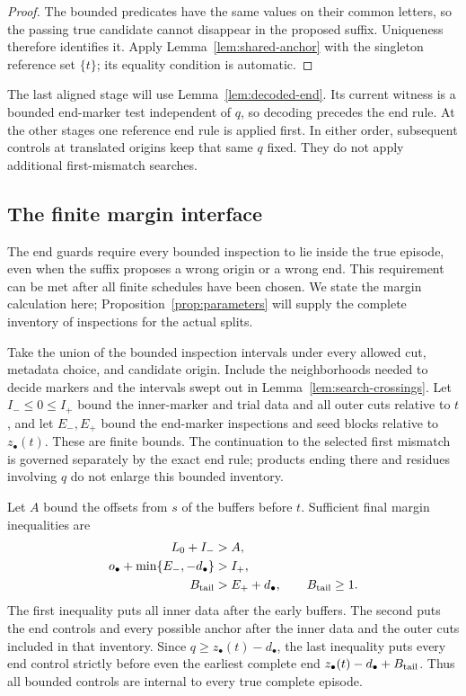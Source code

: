 \begin{proof}
The bounded predicates have the same values on their common letters,
so the passing true candidate cannot disappear in the proposed suffix.
Uniqueness therefore identifies it.  Apply
Lemma~\ref{lem:shared-anchor} with the singleton reference set $\{t\}$;
its equality condition is automatic.
\end{proof}

The last aligned stage will use Lemma~\ref{lem:decoded-end}.  Its current
witness is a bounded end-marker test independent of $q$, so decoding
precedes the end rule.  At the other stages one reference end rule is
applied first.  In either order, subsequent controls at translated
origins keep that same $q$ fixed.  They do not apply additional
first-mismatch searches.

\subsection{The finite margin interface}

The end guards require every bounded inspection to lie inside the true
episode, even when the suffix proposes a wrong origin or a wrong end.
This requirement can be met after all finite schedules have been chosen.
We state the margin calculation here; Proposition~\ref{prop:parameters}
will supply the complete inventory of inspections for the actual splits.

Take the union of the bounded inspection intervals under every allowed
cut, metadata choice, and candidate origin. Include the neighborhoods
needed to decide markers and the intervals swept out in
Lemma~\ref{lem:search-crossings}. Let $I_-\le0\le I_+$ bound the
inner-marker and trial data and all outer cuts relative to $t$, and let $E_-,E_+$ bound
the end-marker inspections and seed blocks relative to $z_\bullet(t)$.
These are finite bounds. The continuation to the selected first mismatch
is governed separately by the exact end rule; products ending there and
residues involving $q$ do not enlarge this bounded inventory.

Let $A$ bound the offsets from $s$ of the buffers before $t$.
Sufficient final margin inequalities are
\begin{equation}\label{eq:geometry-margins}
\begin{split}
 L_0+I_-&>A,\\
 o_\bullet+\min\{E_-,-d_\bullet\}&>I_+,\\
 B_{\rm tail}&>E_++d_\bullet,
 \qquad B_{\rm tail}\ge1.
\end{split}
\end{equation}
The first inequality puts all inner data after the early buffers.
The second puts the end controls and every possible anchor after the
inner data and the outer cuts included in that inventory. Since
$q\ge z_\bullet(t)-d_\bullet$, the last inequality puts every end
control strictly before even the earliest complete end
$z_\bullet(t)-d_\bullet+B_{\rm tail}$. Thus all bounded controls
are internal to every true complete episode.


